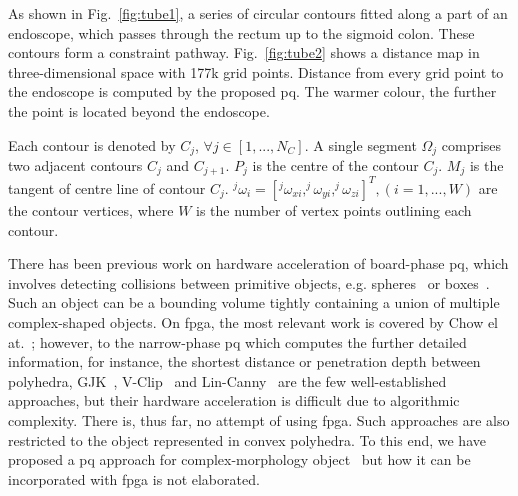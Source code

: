 As shown in Fig.~\ref{fig:tube1}, a series of circular contours fitted along a part of an endoscope, which passes through the rectum up to the sigmoid colon. 
These contours form a constraint pathway. 
Fig.~\ref{fig:tube2} shows a distance map in three-dimensional space with 177k grid points. 
Distance from every grid point to the endoscope is computed by the proposed \gls{pq}. 
The warmer colour, the further the point is located beyond the endoscope.

\begin{mydef}
Each contour is denoted by $C_j$, $\forall j \in [1,...,N_C]$.
A single segment $\Omega_j$ comprises two adjacent contours $C_j$ and $C_{j+1}$.
$P_j$ is the centre of the contour $C_j$.
$M_j$ is the tangent of centre line of contour $C_j$.
$^j\omega_i=[^j\omega_{xi},^j\omega_{yi},^j\omega_{zi}]^T, (i=1,...,W)$ are the contour vertices,
where $W$ is the number of vertex points outlining each contour.
\end{mydef}

There has been previous work on hardware acceleration of board-phase \gls{pq}, which involves detecting collisions between primitive objects, e.g. spheres~\cite{benallegue09} or boxes~\cite{zhang07}. 
Such an object can be a bounding volume tightly containing a union of multiple complex-shaped objects. 
On \gls{fpga}, the most relevant work is covered by Chow el at.~\cite{chow11}; 
however, to the narrow-phase \gls{pq} which computes the further detailed information, for instance, 
the shortest distance or penetration depth between polyhedra, GJK~\cite{gilbert88}, V-Clip~\cite{mirtich98} and Lin-Canny~\cite{lin91} are the few well-established approaches, 
but their hardware acceleration is difficult due to algorithmic complexity. 
There is, thus far, no attempt of using \gls{fpga}. 
Such approaches are also restricted to the object represented in convex polyhedra. 
To this end, we have proposed a \gls{pq} approach for complex-morphology object~\cite{kwok13} but how it can be incorporated with \gls{fpga} is not elaborated.

